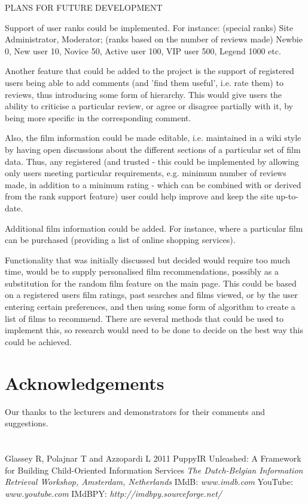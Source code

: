\documentclass{sig-alt-release2}
\begin{document}
PLANS FOR FUTURE DEVELOPMENT
 
Support of user ranks could be implemented. For instance: (special ranks) Site Administrator, Moderator; (ranks based on the number of reviews made) Newbie 0, New user 10, Novice 50, Active user 100, VIP user 500, Legend 1000 etc. 
 
Another feature that could be added to the project is the support of registered users being able to add comments (and 'find them useful', i.e. rate them) to reviews, thus introducing some form of hierarchy. This would give users the ability to criticise a particular review, or agree or disagree partially with it, by being more specific in the corresponding comment. 
 
Also, the film information could be made editable, i.e. maintained in a wiki style by having open discussions about the different sections of a particular set of film data. Thus, any registered (and trusted - this could be implemented by allowing only users meeting particular requirements, e.g. minimum number of reviews made, in addition to a minimum rating - which can be combined with or derived from the rank support feature) user could help improve and keep the site up-to-date. 
 
Additional film information could be added. For instance, where a particular film can be purchased (providing a list of online shopping services). 
 
Functionality that was initially discussed but decided would require too much time, would be to supply personalised film recommendations, possibly as a substitution for the random film feature on the main page. This could be based on a registered users film ratings, past searches and films viewed, or by the user entering certain preferences, and then using some form of algorithm to create a list of films to recommend. There are several methods that could be used to implement this, so research would need to be done to decide on the best way this could be achieved.

\section{Acknowledgements}
Our thanks to the lecturers and demonstrators for their comments and suggestions.

\section*{}
\begin{thebibliography}{9}
 Glassey R, Polajnar T and Azzopardi L 2011 PuppyIR Unleashed: A Framework for Building Child-Oriented Information Services {\it The Dutch-Belgian Information Retrieval Workshop, Amsterdam, Netherlands}
 IMdB: {\it www.imdb.com}
 YouTube: {\it www.youtube.com}
 IMdBPY: {\it http://imdbpy.sourceforge.net/}
\end{thebibliography}
\end{document}
